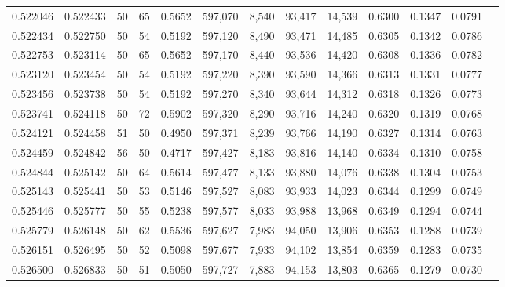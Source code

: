 \begin{tabular}{rrrrrrrrrrrrr}
0.522046 & 0.522433 &    50 &  65 &                                     0.5652 & 597,070 &   8,540 &  93,417 &  14,539 & 0.6300 & 0.1347 & 0.0791 \\
0.522434 & 0.522750 &    50 &  54 &                                     0.5192 & 597,120 &   8,490 &  93,471 &  14,485 & 0.6305 & 0.1342 & 0.0786 \\
0.522753 & 0.523114 &    50 &  65 &                                     0.5652 & 597,170 &   8,440 &  93,536 &  14,420 & 0.6308 & 0.1336 & 0.0782 \\
0.523120 & 0.523454 &    50 &  54 &                                     0.5192 & 597,220 &   8,390 &  93,590 &  14,366 & 0.6313 & 0.1331 & 0.0777 \\
0.523456 & 0.523738 &    50 &  54 &                                     0.5192 & 597,270 &   8,340 &  93,644 &  14,312 & 0.6318 & 0.1326 & 0.0773 \\
0.523741 & 0.524118 &    50 &  72 &                                     0.5902 & 597,320 &   8,290 &  93,716 &  14,240 & 0.6320 & 0.1319 & 0.0768 \\
0.524121 & 0.524458 &    51 &  50 &                                     0.4950 & 597,371 &   8,239 &  93,766 &  14,190 & 0.6327 & 0.1314 & 0.0763 \\
0.524459 & 0.524842 &    56 &  50 &                                     0.4717 & 597,427 &   8,183 &  93,816 &  14,140 & 0.6334 & 0.1310 & 0.0758 \\
0.524844 & 0.525142 &    50 &  64 &                                     0.5614 & 597,477 &   8,133 &  93,880 &  14,076 & 0.6338 & 0.1304 & 0.0753 \\
0.525143 & 0.525441 &    50 &  53 &                                     0.5146 & 597,527 &   8,083 &  93,933 &  14,023 & 0.6344 & 0.1299 & 0.0749 \\
0.525446 & 0.525777 &    50 &  55 &                                     0.5238 & 597,577 &   8,033 &  93,988 &  13,968 & 0.6349 & 0.1294 & 0.0744 \\
0.525779 & 0.526148 &    50 &  62 &                                     0.5536 & 597,627 &   7,983 &  94,050 &  13,906 & 0.6353 & 0.1288 & 0.0739 \\
0.526151 & 0.526495 &    50 &  52 &                                     0.5098 & 597,677 &   7,933 &  94,102 &  13,854 & 0.6359 & 0.1283 & 0.0735 \\
0.526500 & 0.526833 &    50 &  51 &                                     0.5050 & 597,727 &   7,883 &  94,153 &  13,803 & 0.6365 & 0.1279 & 0.0730 \\

\end{tabular}
